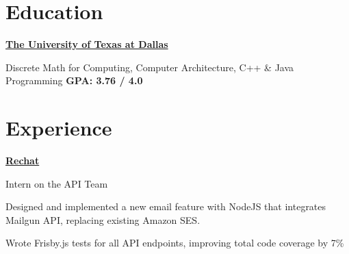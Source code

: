 \documentclass[]{deedy-resume-openfont}
\begin{document}

\begin{minipage}[t]{1.00\textwidth} 

\section{Education} 

\runsubsection \textbf {\href{http://cs.utdallas.edu}{The University of Texas at Dallas}}
\vspace{\topsep} %
\experienceDate{}
\begin{tightemize}
\item Discrete Math for Computing, Computer Architecture, C++ \& Java Programming \hspace{81pt} \GPAfont \textbf {GPA:  \hspace{3pt}3.76 \hspace{1pt}/ \hspace{1pt} 4.0}
\end{tightemize}
\sectionsep



\section{Experience}

\runsubsection \textbf{\href{https://rechat.com}{Rechat}}
\begin{tightemize}
\item Intern on the API Team
\item Designed and implemented a new email feature with NodeJS that integrates Mailgun API, replacing existing Amazon SES.
\item Wrote Frisby.js tests for all API endpoints, improving total code coverage by 7\%
\end{tightemize}
\sectionsep



\end{minipage}
\end{document}
